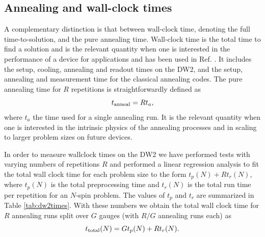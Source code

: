 \subsection{Annealing and wall-clock times}
\label{sec:wall-clock-annealing-class}
A complementary distinction is that between {wall-clock time}, denoting the full time-to-solution, and the {pure annealing time}. Wall-clock time is the total time to find a solution and is the relevant quantity when one is interested in the performance of a device for applications and has been used in Ref. \cite{McGeoch}. It includes the setup, cooling, annealing and readout times on the DW2, and the setup, annealing and measurement time for the classical annealing codes.
The pure annealing time for $R$ repetitions is straightforwardly defined as
\begin{equation}
t_{\rm anneal}=Rt_a,
\end{equation}
where $t_a$ the time used for a single annealing run. It is the relevant quantity when one is interested in the intrinsic physics of the annealing processes and in scaling to larger problem sizes on future devices.

In order to measure wallclock times on the DW2 we have performed tests with varying numbers of repetitions $R$ and performed a linear regression analysis to fit the total wall clock time for each problem size to the form $t_p(N)+Rt_r(N)$, where $t_p(N)$ is the total preprocessing time and $t_r(N)$ is the total run time per repetition for an $N$-spin problem. The values of $t_p$ and $t_r$ are summarized in Table \ref{tab:dw2times}. With these numbers we obtain the total wall clock time for $R$ annealing runs split over $G$ gauges (with $R/G$ annealing runs each) as
\begin{equation}
t_{\rm total}(N)=Gt_p(N)+Rt_r(N) .\\
\label{eq:wc}
\end{equation}


